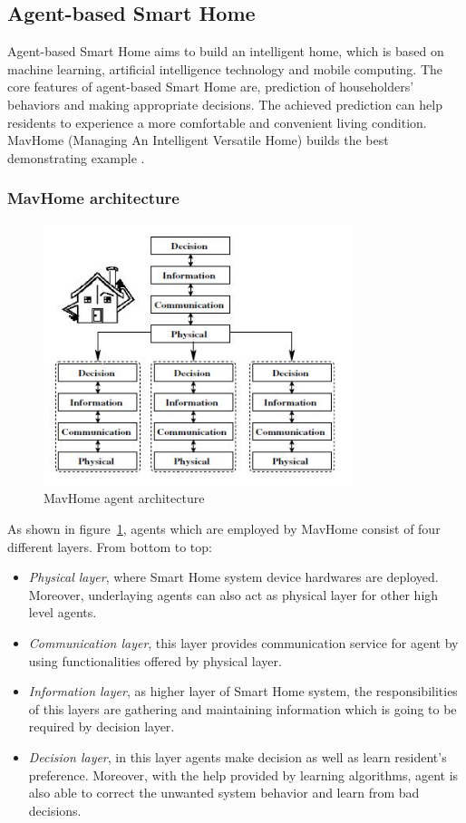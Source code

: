 \subsection{Agent-based Smart Home} \label{secAgent}
Agent-based Smart Home aims to build an intelligent home, which is based on machine learning, artificial intelligence technology and mobile computing. The core features of agent-based Smart Home are, prediction of householders' behaviors and making appropriate decisions. The achieved prediction can help residents to experience a more comfortable and convenient living condition. MavHome (Managing An Intelligent Versatile Home) builds the best demonstrating example \cite{smart_home_agent} . 

\subsubsection{MavHome architecture}
 \begin{figure}[!htbp]
	\centering
	\includegraphics[width=0.8\textwidth]{smart-home-agent.jpg}
		\caption{MavHome agent architecture \cite{smart_home_agent}}
	\label{fig:smart-home-agent}
\end{figure}
As shown in figure~\ref{fig:smart-home-agent}, agents which are employed by MavHome consist of four different layers. From bottom to top:
\begin{itemize}
\item \emph{Physical layer}, where Smart Home system device hardwares are deployed. Moreover, underlaying agents can also act as physical layer for other high level agents.
\item \emph{Communication layer}, this layer provides communication service for agent by using functionalities offered by physical layer.
\item \emph{Information layer}, as higher layer of Smart Home system,  the responsibilities of this layers are gathering and maintaining information which is going to be required by decision layer.
\item \emph{Decision layer}, in this layer agents make decision as well as learn resident's preference. Moreover, with the help provided by learning algorithms, agent is also able to correct the unwanted system behavior and learn from bad decisions.
\end{itemize}
